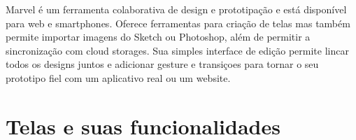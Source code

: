 Marvel \cite{marvel} é um ferramenta colaborativa de design e prototipação e está disponível para web e smartphones. Oferece ferramentas para criação de telas mas também permite importar imagens do Sketch ou Photoshop, além de permitir a sincronização com cloud storages. Sua simples interface de edição permite lincar todos os designs juntos e adicionar gesture e transiçoes para tornar o seu prototipo fiel com um aplicativo real ou um website.

\section{Telas e suas funcionalidades}
